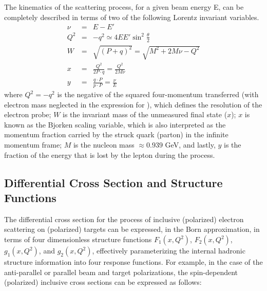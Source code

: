 The kinematics of the scattering process, for a given beam energy E, can be completely described in terms of %
two of the following Lorentz invariant variables. %
\begin{eqnarray}
\label{nuQ2W}
\nu &=& E - E'    \\
Q^2 &=& -q^2  \simeq  4 E E' \sin^2 \frac{\theta}{2}   \\
W   &=& \sqrt{(P+q)^2} = \sqrt{M^2 + 2M \nu  - Q^2}          \\
x   &=& \frac{Q^2}{2P\cdot q} = \frac{Q^2}{2M\nu}     \\
y   &=& \frac{q \cdot P}{p \cdot P} = \frac{\nu}{E}
\end{eqnarray}
where $Q^2 = - q^2$ is the negative of the squared four-momentum transferred (with electron mass neglected %
in the expression for \qsq), which defines the resolution %
of the electron probe;  $W$ is the invariant mass of the unmeasured final state ($x$);  $x$ is known as the Bjorken scaling variable, which is also interpreted as the momentum fraction carried by the struck quark (parton) in the infinite momentum frame;  $M$ is the nucleon mass $\approx 0.939$ GeV, and lastly, $y$ is the fraction of the energy that is lost by the lepton during the process. 
 



\subsection{Differential Cross Section and Structure Functions}

The differential cross section for the process of inclusive (polarized) electron %
scattering on (polarized) targets can be expressed, in the Born approximation, in terms of four dimensionless structure functions $F_1(x,Q^2)$, $F_2(x,Q^2)$, $g_1(x,Q^2)$, and $g_2(x,Q^2)$, effectively parameterizing the internal hadronic structure information into four response functions. %
For example, in the case of the anti-parallel or parallel beam and target polarizations, the spin-dependent (polarized) inclusive cross sections can be expressed as follows:

